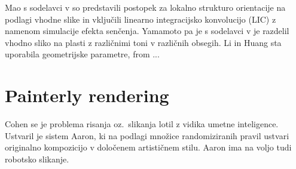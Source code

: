 Mao s sodelavci v \cite{Mao:Automatic} so predstavili postopek za lokalno strukturo orientacije na podlagi vhodne slike in vključili linearno integracijsko konvolucijo (LIC) z namenom simulacije efekta senčenja. Yamamoto pa je s sodelavci v \cite{Yamamoto:Filter} je razdelil vhodno sliko na plasti z različnimi toni v različnih obsegih. Li in Huang \cite{Li:Feature} sta uporabila geometrijske parametre, from ... %
%
\section{Painterly rendering}
Cohen \cite{Cohen:Aaron, Morbey:Aaron} se je problema risanja oz.\ slikanja lotil z vidika umetne inteligence. Ustvaril je sistem Aaron, ki na podlagi množice randomiziranih pravil ustvari originalno kompozicijo v določenem artističnem stilu. Aaron ima na voljo tudi robotsko slikanje.
  
